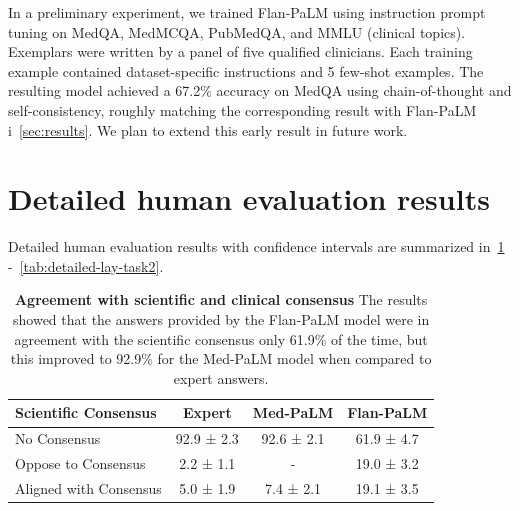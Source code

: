 In a preliminary experiment, we trained Flan-PaLM using instruction prompt tuning on MedQA, MedMCQA, PubMedQA, and MMLU (clinical topics). Exemplars were written by a panel of five qualified clinicians. Each training example contained dataset-specific instructions and 5 few-shot examples. The resulting model achieved a 67.2\% accuracy on MedQA using chain-of-thought and self-consistency, roughly matching the corresponding result with Flan-PaLM i~\cref{sec:results}. We plan to extend this early result in future work.
\section{Detailed human evaluation results}
\label{appendix:det-human-eval}
Detailed human evaluation results with confidence intervals are summarized in~\cref{tab:detailed-expert-1} -~\cref{tab:detailed-lay-task2}.

\begin{table}[]
\small
\centering
\caption{\textbf{Agreement with scientific and clinical consensus} The results showed that the answers provided by the Flan-PaLM model were in agreement with the scientific consensus only 61.9\% of the time, but this improved to 92.9\% for the Med-PaLM model when compared to expert answers.}
\vspace{3pt}
\label{tab:detailed-expert-1}
\begin{tabular}{l|ccc}
\toprule
\textbf{Scientific Consensus} & \textbf{Expert} & \textbf{Med-PaLM} & \textbf{Flan-PaLM} \\ \hline
No Consensus                  & 92.9 ± 2.3      & 92.6 ± 2.1        & 61.9 ± 4.7         \\
Oppose to Consensus           & 2.2 ± 1.1       & -                 & 19.0 ± 3.2         \\
Aligned with Consensus        & 5.0 ± 1.9       & 7.4 ± 2.1         & 19.1 ± 3.5        \\ \bottomrule
\end{tabular}
\end{table}


